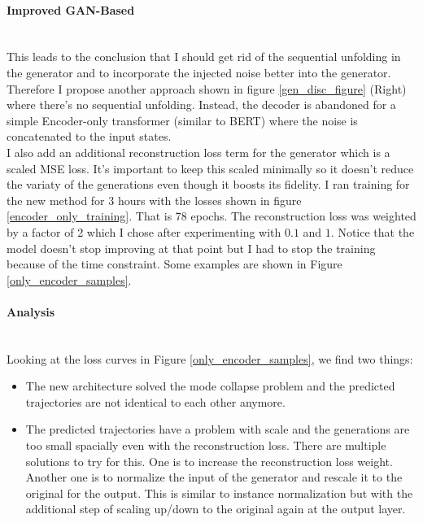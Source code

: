 \documentclass{article}
\begin{document}
\paragraph{Improved GAN-Based}$ $
\\
This leads to the conclusion that I should get rid of the sequential unfolding in the generator and to incorporate the injected noise better into the generator. Therefore I propose another approach shown in figure \ref{gen_disc_figure} (Right) where there's no sequential unfolding. Instead, the decoder is abandoned for a simple Encoder-only transformer (similar to BERT) where the noise is concatenated to the input states. \\
I also add an additional reconstruction loss term for the generator which is a scaled MSE loss. It's important to keep this scaled minimally so it doesn't reduce the variaty of the generations even though it boosts its fidelity. 
I ran training for the new method for 3 hours with the losses shown in figure \ref{encoder_only_training}. That is 78 epochs.  The reconstruction loss was weighted by a factor of 2 which I chose after experimenting with $0.1$ and $1$.  Notice that the model doesn't stop improving at that point but I had to stop the training because of the time constraint.  Some examples are shown in Figure \ref{only_encoder_samples}.

\paragraph{Analysis}$ $
\\Looking at the loss curves in Figure \ref{only_encoder_samples}, we find two things:
\begin{itemize}
\item The new architecture solved the mode collapse problem and the predicted trajectories are not identical to each other anymore.
\item The predicted trajectories have a problem with scale and the generations are too small spacially even with the reconstruction loss. There are multiple solutions to try for this. One is to increase the reconstruction loss weight. Another one is to normalize the input of the generator and rescale it to the original for the output. This is similar to instance normalization but with the additional step of scaling up/down to the original again at the output layer. 
\end{itemize}
\end{document}
